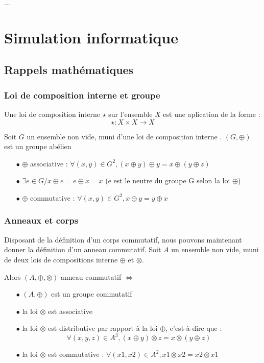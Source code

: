 \documentclass[a4paper,12pt]{report}
\newcommand{\para}[1]{\par{#1}\\}
\begin{document}
\para{
...
}

\chapter{Simulation informatique}
	\section{Rappels mathématiques}
		\subsection{Loi de composition interne et groupe}

\par{
Une loi de composition interne $\star{}$ sur l'ensemble $X$ est une aplication de la forme : \[\star : X \times X \rightarrow X\]
}

\par{
	Soit $G$ un ensemble non vide, muni d'une loi de composition interne \oplus. $ (G, \oplus)$ est un groupe abélien \Leftrightarrow
}

\begin{itemize}
\item[$\bullet$] $\oplus$ associative : $\forall (x,y) \in G^2, (x \oplus y) \oplus y = x \oplus ( y \oplus z )$
\item[$\bullet$] $\exists e \in G / x \oplus e = e \oplus x = x$ (e est le neutre du groupe G selon la loi $\oplus$)
\item[$\bullet$] $\oplus$ commutative : $\forall (x,y) \in G^2, x \oplus y = y \oplus x$ \\
\end{itemize}

		\subsection{Anneaux et corps}

\par{
	Disposant de la définition d'un corps commutatif, nous pouvons maintenant donner la définition d'un anneau commutatif. Soit $A$ un ensemble non vide, muni de deux lois de compositions interne $\oplus$ et $\otimes$.
}

\par{
	Alors $(A, \oplus, \otimes)$ anneau commutatif $\Leftrightarrow$
}

\begin{itemize}
\item[$\bullet$] $ (A, \oplus)$ est un groupe commutatif
\item[$\bullet$] la loi $\otimes$ est associative
\item[$\bullet$] la loi $\otimes$ est distributive par rapport à la loi $\oplus$, c'est-à-dire que : \[ \forall (x,y,z) \in A^3, (x \oplus y) \otimes z = x \otimes ( y \oplus z ) \]
\item[$\bullet$] la loi $\otimes$ est commutative : $\forall (x1,x2) \in A^2, x1 \otimes x2 = x2 \otimes x1$
\end{itemize}
\end{document}
